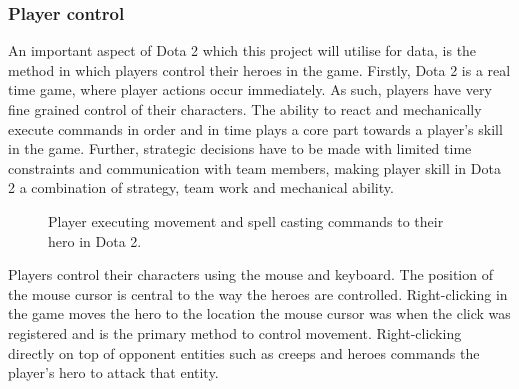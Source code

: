 \documentclass[Report.tex]{subfiles}
\begin{document}
\subsubsection{Player control}\label{sec:dota-control}
An important aspect of Dota 2 which this project will utilise for data, is the method in which players control their heroes in the game. Firstly, Dota 2 is a real time game, where player actions occur immediately. As such, players have very fine grained control of their characters. The ability to react and mechanically execute commands in order and in time plays a core part towards a player's skill in the game. Further, strategic decisions have to be made with limited time constraints and communication with team members, making player skill in Dota 2 a combination of strategy, team work and mechanical ability. 

\begin{figure}[H]
\begin{subfigure}{0.4\textwidth}
\end{subfigure}
\hspace{\fill}
\begin{subfigure}{0.4\textwidth}
\end{subfigure}
\caption{Player executing movement and spell casting commands to their hero in Dota 2.}
\end{figure}

Players control their characters using the mouse and keyboard. The position of the mouse cursor is central to the way the heroes are controlled. Right-clicking in the game moves the hero to the location the mouse cursor was when the click was registered and is the primary method to control movement. Right-clicking directly on top of opponent entities such as creeps and heroes commands the player's hero to attack that entity. 
\end{document}
